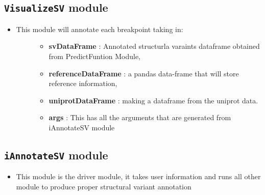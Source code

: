 \documentclass[letterpaper,10pt,english]{sphinxmanual}
\begin{document}
\subsection{\texttt{VisualizeSV} module}
\label{iAnnotateSV:visualizesv-module}\begin{itemize}
\item {} \begin{description}
\item[{This module will annotate each breakpoint taking in:}] \leavevmode\begin{itemize}
\item {} 
\textbf{svDataFrame} : Annotated structurla varaints dataframe obtained from PredictFuntion Module,

\item {} 
\textbf{referenceDataFrame} : a pandas data-frame that will store reference information,

\item {} 
\textbf{uniprotDataFrame} : making a dataframe from the uniprot data.

\item {} 
\textbf{args} : This has all the arguments that are generated from iAnnotateSV module

\end{itemize}
\begin{quote}\begin{description}
\item[{Example}] \leavevmode
{}

\item[{Example Plot}] \leavevmode
{\hspace*{\fill}}\hspace*{\fill}}

\end{description}\end{quote}

\end{description}

\end{itemize}


\subsection{\texttt{iAnnotateSV} module}
\label{iAnnotateSV:iannotatesv-module}\begin{itemize}
\item {} 
This module is the driver module, it takes user information and runs all other module to produce proper structural variant annotation

\end{itemize}
\end{document}
